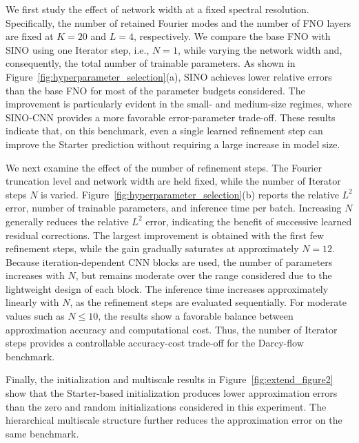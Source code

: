 \documentclass[preprint,numbers,sort&compress]{elsarticle}
\begin{document}
			
			We first study the effect of network width at a fixed spectral resolution. Specifically, the number of retained Fourier modes and the number of FNO layers are fixed at $K=20$ and $L=4$, respectively. We compare the base FNO
			with SINO using one Iterator step, i.e., $N=1$, while varying the network width and, consequently, the total number of trainable parameters. As shown in Figure~\ref{fig:hyperparameter_selection}(a), SINO achieves lower relative errors than the base FNO for most of the parameter budgets considered. The improvement is particularly evident in the small- and medium-size regimes, where SINO-CNN provides a more favorable error-parameter trade-off. These results indicate that, on this benchmark, even a single learned refinement step can improve the Starter prediction without requiring a large increase in model size.
			
			We next examine the effect of the number of refinement steps. The Fourier truncation level and network width are held fixed, while the number of Iterator steps $N$ is varied. Figure~\ref{fig:hyperparameter_selection}(b) reports the
			relative $L^2$ error, number of trainable parameters, and inference time per batch. Increasing $N$ generally reduces the relative $L^2$ error, indicating the benefit of successive learned residual corrections. The largest improvement is obtained with the first few refinement steps, while the gain gradually saturates at approximately $N=12$. Because iteration-dependent CNN blocks are used, the number of parameters increases with $N$, but remains moderate over the range considered due to the lightweight design of each block. The inference time increases approximately linearly with $N$, as the refinement steps are evaluated sequentially. For moderate values such as $N\leq10$, the results show a favorable balance between approximation accuracy and computational cost. Thus, the number of Iterator steps provides a controllable accuracy-cost trade-off for the Darcy-flow benchmark.
			
			Finally, the initialization and multiscale results in Figure~\ref{fig:extend_figure2} show that the Starter-based initialization produces lower approximation errors than the zero and random initializations considered in this experiment. The hierarchical multiscale structure further reduces the approximation error on the same benchmark.
			
			
			
\end{document}
